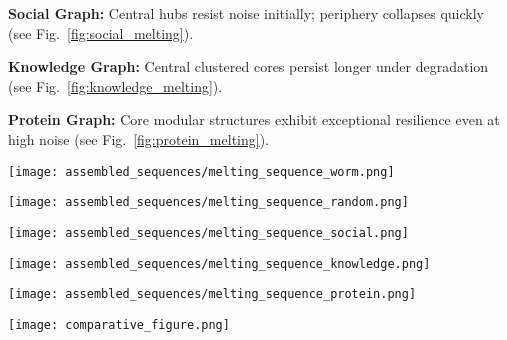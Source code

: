 \documentclass[conference]{IEEEtran}
\begin{document}
\textbf{Social Graph:} Central hubs resist noise initially; periphery collapses quickly (see Fig.~\ref{fig:social_melting}).

\textbf{Knowledge Graph:} Central clustered cores persist longer under degradation (see Fig.~\ref{fig:knowledge_melting}).

\textbf{Protein Graph:} Core modular structures exhibit exceptional resilience even at high noise (see Fig.~\ref{fig:protein_melting}).

\begin{figure*}[!htb]
\centering
\texttt{[image: assembled\_sequences/melting\_sequence\_worm.png]}
\caption{Relational melting sequence for Worm Brain simulation: Modular stability under progressive noise.}
\label{fig:worm_melting}
\end{figure*}

\begin{figure*}[!htb]
\centering
\texttt{[image: assembled\_sequences/melting\_sequence\_random.png]}
\caption{Relational melting sequence for Random Graph simulation: Rapid structural collapse.}
\label{fig:random_melting}
\end{figure*}

\begin{figure*}[!htb]
\centering
\texttt{[image: assembled\_sequences/melting\_sequence\_social.png]}
\caption{Relational melting sequence for Social Graph simulation: Local hubs resist but periphery collapses.}
\label{fig:social_melting}
\end{figure*}

\begin{figure*}[!htb]
\centering
\texttt{[image: assembled\_sequences/melting\_sequence\_knowledge.png]}
\caption{Relational melting sequence for Knowledge Graph simulation: Semi-organized cluster resilience.}
\label{fig:knowledge_melting}
\end{figure*}

\begin{figure*}[!htb]
\centering
\texttt{[image: assembled\_sequences/melting\_sequence\_protein.png]}
\caption{Relational melting sequence for Protein Graph simulation: Core modular structures persist.}
\label{fig:protein_melting}
\end{figure*}

\begin{figure*}[!htb]
\centering
\texttt{[image: comparative\_figure.png]}
\caption{Snapshots of relational melting at $\sim$30\% noise. Blue indicates stable snowflakes; red indicates melting (high drift).}
\label{fig:comparative}
\end{figure*}
\end{document}
